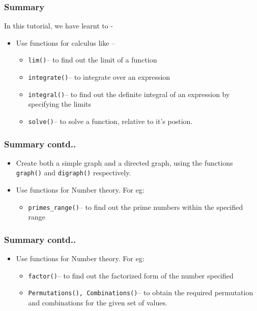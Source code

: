 \documentclass[17pt,compress]{beamer}
\begin{document}
\begin{frame}
\frametitle{Summary}
\label{sec-5.1}

In this tutorial, we have learnt to -  

\begin{itemize}
\item Use functions for calculus like --
	\begin{itemize}
	\item \texttt{lim()}-- to find out the limit of a function
	\item \texttt{integrate()}-- to integrate over an expression
	\item \texttt{integral()}-- to find out the definite integral of an 
      expression by specifying the limits
	\item \texttt{solve()}-- to solve a function, relative to it's postion.
	\end{itemize}
\end{itemize}
\end{frame}
\begin{frame}
\frametitle{Summary contd..}
\label{sec-5.2}

\begin{itemize}
\item Create both a simple graph and a directed graph, using the 
    functions \texttt{graph()} and \texttt{digraph()} respectively.
\item Use functions for Number theory. For eg:
	\begin{itemize}
	\item \texttt{primes\_range()}-- to find out the prime numbers within the 
      specified range
	\end{itemize}
\end{itemize}
\end{frame}
\begin{frame}
\frametitle{Summary contd..}
\label{sec-5.3}

\begin{itemize}
\item Use functions for Number theory. For eg:
	\begin{itemize}
	\item \texttt{factor()}-- to find out the factorized form of the number specified
	\item \texttt{Permutations(), Combinations()}-- to obtain the required permutation 
      and combinations for the given set of values.
	\end{itemize}
\end{itemize}
\end{frame}
\end{document}
